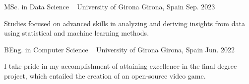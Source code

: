 

\begin{cventries}

  \cventry
    {MSc. in Data Science \ \href{https://1drv.ms/b/s!AkpkVWgTjVvhg75Ia949k6hMR4yAdQ?e=RifsPu}{{\scriptsize \faPaperclip}}} %
    {University of Girona} %
    {Girona, Spain} %
    {Sep. 2023} %
    {
      \begin{cvitems} %
      \item {
      Studies focused on advanced skills in analyzing and deriving insights from data using statistical and machine learning methods.
      }
      \end{cvitems}
    }

    \cventry
    {BEng. in Computer Science \ \href{https://1drv.ms/b/s!AkpkVWgTjVvhg74LnMHf7OWtWJlmrg?e=gcWA80}{{\scriptsize \faPaperclip}}} %
    {University of Girona} %
    {Girona, Spain} %
    {Jun. 2022} %
    {
      \begin{cvitems} %
        \item {I take pride in my accomplishment of attaining excellence in the final degree project, which entailed the creation of an open-source video game.
}
      \end{cvitems}
    }

\end{cventries}
